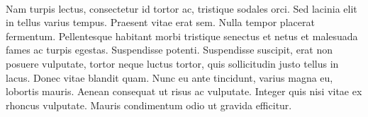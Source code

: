 \documentclass[11pt,a4paper]{article}
\begin{document}
\\
Nam turpis lectus, consectetur id tortor ac, tristique sodales orci. Sed lacinia elit in tellus varius tempus. Praesent vitae erat sem. Nulla tempor placerat fermentum. Pellentesque habitant morbi tristique senectus et netus et malesuada fames ac turpis egestas. Suspendisse potenti. Suspendisse suscipit, erat non posuere vulputate, tortor neque luctus tortor, quis sollicitudin justo tellus in lacus. Donec vitae blandit quam. Nunc eu ante tincidunt, varius magna eu, lobortis mauris. Aenean consequat ut risus ac vulputate. Integer quis nisi vitae ex rhoncus vulputate. Mauris condimentum odio ut gravida efficitur. 
\end{document}
